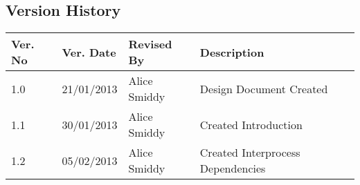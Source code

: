 \subsection{Version History}

{
    \def\Version#1#2#3#4{\hline #1 & #2 & #3 & #4 \\}
    \def\Header#1{\bf\small #1}

    {\footnotesize
        \renewcommand{\arraystretch}{1.5}
        \begin{tabularx}{\textwidth}{|l|l|l|X|}
            \hline
            \Header{Ver. No} &
            \Header{Ver. Date} &
            \Header{Revised By} &
            \Header{Description} \\

            \Version{1.0}{21/01/2013}{Alice Smiddy}{Design Document Created}
            \Version{1.1}{30/01/2013}{Alice Smiddy}{Created Introduction}
            \Version{1.2}{05/02/2013}{Alice Smiddy}{Created Interprocess Dependencies}
            \hline
        \end{tabularx}
    }
}
